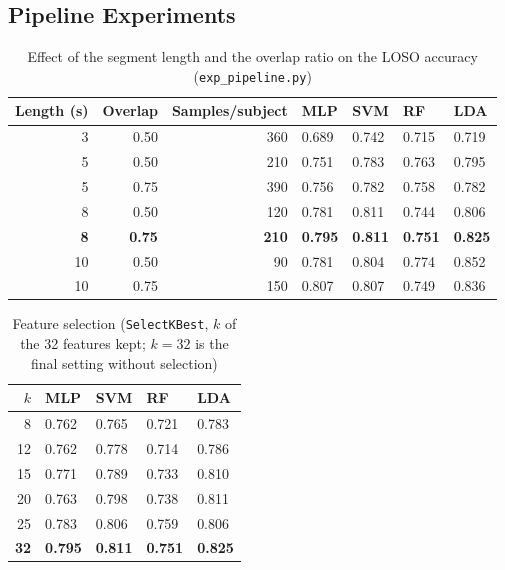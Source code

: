 \FloatBarrier
\subsection{Pipeline Experiments}
\begin{table}[H]
    \centering
    \caption{Effect of the segment length and the overlap ratio on the LOSO accuracy (\texttt{exp\_pipeline.py})}
    \label{tab:seg_sweep}
    \begin{tabularx}{\textwidth}{@{} r r r X X X X @{}}
        \toprule
        \textbf{Length (s)} & \textbf{Overlap} & \textbf{Samples/subject} & \textbf{MLP} & \textbf{SVM} & \textbf{RF} & \textbf{LDA} \\
        \midrule
        3 & 0.50 & 360 & 0.689 & 0.742 & 0.715 & 0.719 \\
        5 & 0.50 & 210 & 0.751 & 0.783 & 0.763 & 0.795 \\
        5 & 0.75 & 390 & 0.756 & 0.782 & 0.758 & 0.782 \\
        8 & 0.50 & 120 & 0.781 & 0.811 & 0.744 & 0.806 \\
        \textbf{8} & \textbf{0.75} & \textbf{210} & \textbf{0.795} & \textbf{0.811} & \textbf{0.751} & \textbf{0.825} \\
        10 & 0.50 & 90 & 0.781 & 0.804 & 0.774 & 0.852 \\
        10 & 0.75 & 150 & 0.807 & 0.807 & 0.749 & 0.836 \\
        \bottomrule
    \end{tabularx}
\end{table}

\begin{table}[!htb]
    \centering
    \caption{Feature selection (\texttt{SelectKBest}, $k$ of the 32 features kept; $k=32$ is the final setting without selection)}
    \label{tab:featsel}
    \begin{tabularx}{\textwidth}{@{} r X X X X @{}}
        \toprule
        \textbf{$k$} & \textbf{MLP} & \textbf{SVM} & \textbf{RF} & \textbf{LDA} \\
        \midrule
        8 & 0.762 & 0.765 & 0.721 & 0.783 \\
        12 & 0.762 & 0.778 & 0.714 & 0.786 \\
        15 & 0.771 & 0.789 & 0.733 & 0.810 \\
        20 & 0.763 & 0.798 & 0.738 & 0.811 \\
        25 & 0.783 & 0.806 & 0.759 & 0.806 \\
        \textbf{32} & \textbf{0.795} & \textbf{0.811} & \textbf{0.751} & \textbf{0.825} \\
        \bottomrule
    \end{tabularx}
\end{table}
